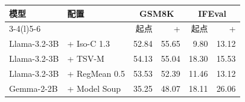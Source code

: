 \begin{tabular}{@{}llrrrr@{}}
\toprule
模型 & \method{} 配置 & \multicolumn{2}{c}{GSM8K} & \multicolumn{2}{c}{IFEval} \\
\cmidrule(lr){3-4}\cmidrule(l){5-6}
 &  & 起点 & + \method{} & 起点 & + \method{} \\
\midrule
Llama-3.2-3B & \method{} + Iso-C 1.3 & 52.84 & 55.65 & 9.80 & 13.12 \\
Llama-3.2-3B & \method{} + TSV-M & 54.13 & 55.04 & 18.30 & 15.53 \\
Llama-3.2-3B & \method{} + RegMean 0.5 & 53.53 & 52.39 & 11.46 & 13.12 \\
Gemma-2-2B & \method{} + Model Soup & 35.25 & 48.07 & 18.11 & 26.06 \\
\bottomrule
\end{tabular}
